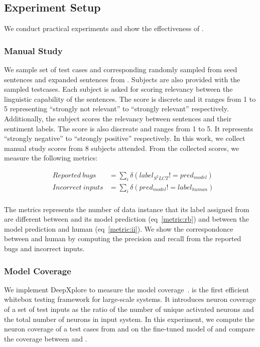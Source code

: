 \subsection{Experiment Setup}
We conduct practical experiments and show the effectiveness of
\tool.
\subsubsection*{\textbf{Manual Study}}
We sample set of test cases and corresponding \lc randomly sampled
from seed sentences and expanded sentences from \tool.  Subjects are
also provided with the sampled testcases. Each subject is asked for
scoring relevancy between the linguistic capability of the
sentences. The score is discrete and it ranges from 1 to 5
representing ``strongly not relevant'' to ``strongly relevant''
respectively. Additionally, the subject scores the relevancy between
sentences and their sentiment labels. The score is also discreate and
ranges from 1 to 5. It represents ``strongly negative'' to ``strongly
positive'' respectively. In this work, we collect manual study scores
from 8 subjects attended. From the collected scores, we measure the
following metrics:

\begin{eqnarray}
  &Reported\:bugs &=\sum_{i} \delta(label_{S^2LCT}!=pred_{model}) \label{metric:rb}\\
  &Incorrect\:inputs &= \sum_{i} \delta(pred_{model}!=label_{human}) \label{metric:ii}\\
\end{eqnarray}

The metrics represents the number of data instance that its label
assigned from are different between \tool and its model prediction
(eq~\ref{metric:rb}) and between the model prediction and human
(eq~\ref{metric:ii}). We show the correspondonce between \tool and
human by computing the precision and recall from the reported bugs and
incorrect inputs.

\subsubsection*{\textbf{Model Coverage}}
We implement DeepXplore to measure the \sa model
coverage~\cite{pei2017deepxplore}. \Dxp is the first efficient
whitebox testing framework for large-scale \dl systems. It introduces
neuron coverage of a set of test inputs as the ratio of the number of
unique activated neurons and the total number of neurons in input \dl
system. In this experiment, we compute the neuron coverage of a test
cases from \tool and \Cklst on the fine-tuned \sa model of
\bertsamodel and compare the coverage between \tool and \Cklst.

